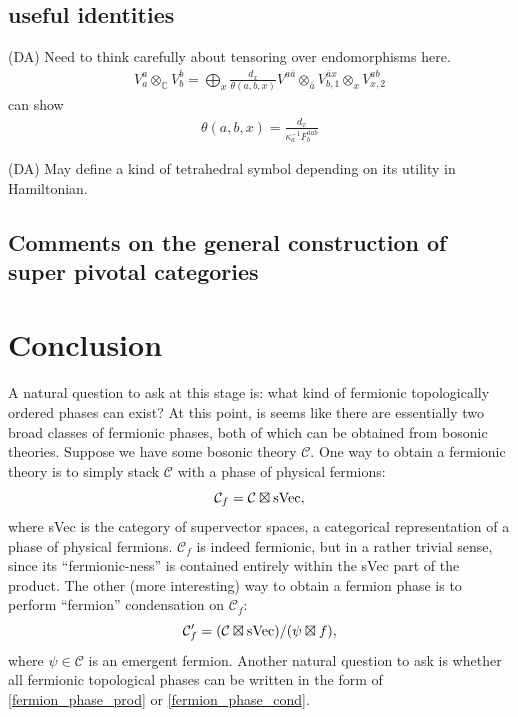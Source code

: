 \documentclass[12pt,a4paper]{article}
\newcommand{\tp}{\otimes}
\newcommand\be            {\begin{equation}}
\newcommand\ee            {\end{equation}}
\newcommand{\mcc}{\mathcal{C}}
\newcommand{\dave}[1]{{\color{ao(english)}\footnotesize{(DA) #1}}}
\begin{document}
\subsection{useful identities}

\dave{Need to think carefully about tensoring over endomorphisms here.}
\begin{align}
V^a_a \tp_{\mathbb{C}} V^b_b = \bigoplus_x \frac{d_x}{\theta(a,b,x)} V^{a \bar{a}} \tp_{\bar{a}}V^{\bar{a}x}_{b,1} \tp_x V^{ab}_{x,2}
\end{align}
can show
\begin{align}
\theta(a,b,x) = \frac{d_x}{\kappa_a^{-1} F^{\bar{a} a b}_b}
\end{align}

\dave{May define a kind of tetrahedral symbol depending on its utility in Hamiltonian.}


\subsection{Comments on the general construction of super pivotal categories}




\section{Conclusion}

A natural question to ask at this stage is: what kind of fermionic topologically ordered phases can exist? At this point, is seems like there are essentially two broad classes of fermionic phases, both of which can be obtained from bosonic theories. Suppose we have some bosonic theory $\mcc$. One way to obtain a fermionic theory is to simply stack $\mcc$ with a phase of physical fermions:
\be \label{fermion_phase_prod} \mcc_f = \mcc \boxtimes {\rm sVec}, \ee
where sVec is the category of supervector spaces, a categorical representation of a phase of physical fermions. $\mcc_f$ is indeed fermionic, but in a rather trivial sense, since its ``fermionic-ness'' is contained entirely within the sVec part of the product. The other (more interesting) way to obtain a fermion phase is to perform ``fermion'' condensation on $\mcc_f$:
\be \label{fermion_phase_cond} \mcc_f' = (\mcc \boxtimes {\rm sVec}) / (\psi \boxtimes f),\ee
where $\psi \in \mcc$ is an emergent fermion. 
Another natural question to ask is whether all fermionic topological phases can be written in the form of \eqref{fermion_phase_prod} or \eqref{fermion_phase_cond}. 
\end{document}
